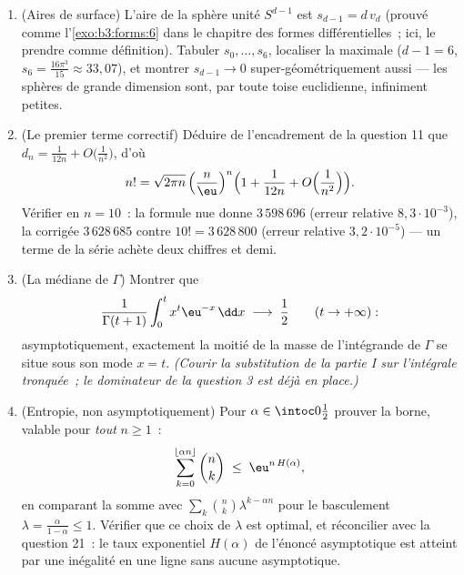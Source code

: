 \begin{problem}
\begin{enumerate}[resume]
        $H(\alpha) < \ln2$ pour $\alpha \neq \frac12$
        (donc les binomiaux hors  sont
        exponentiellement négligeables dans $2^n$).
  \item (Aires de surface) L'aire de la sphère unité
        $S^{d-1}$ est $s_{d-1} = d\,v_d$ (prouvé comme
        l'\cref{exo:b3:forms:6} dans le chapitre des formes
        différentielles~; ici, le prendre comme définition).
        Tabuler $s_0, \dots, s_6$, localiser la maximale ($d
        - 1 = 6$, $s_6 = \frac{16\pi^3}{15} \approx
        33{,}07$), et montrer $s_{d-1} \to 0$
        super-géométriquement aussi --- les sphères de
        grande dimension sont, par toute toise euclidienne,
        infiniment petites.
  \item (Le premier terme correctif) Déduire de
        l'encadrement de la question 11 que $d_n =
        \frac1{12n} + O\bigl(\frac1{n^2}\bigr)$, d'où
        \[
        n! = \sqrt{2\pi n}\,\Bigl(\frac
        n\eu\Bigr)^{n}\Bigl(1 + \frac1{12n} +
        O\Bigl(\frac1{n^2}\Bigr)\Bigr).
        \]
        Vérifier en $n = 10$~: la formule nue donne
        $3\,598\,696$ (erreur relative $8{,}3\cdot10^{-3}$),
        la corrigée $3\,628\,685$ contre $10! =
        3\,628\,800$ (erreur relative $3{,}2\cdot10^{-5}$)
        --- un terme de la série achète deux chiffres et
        demi.
  \item (La médiane de $\Gamma$) Montrer que
        \[
        \frac{1}{\Gamma(t+1)}
        \int_0^{t} x^{t}\eu^{-x}\,\dd x
        \;\longrightarrow\; \frac12
        \qquad (t \to +\infty) :
        \]
        asymptotiquement, exactement la moitié de la masse
        de l'intégrande de $\Gamma$ se situe sous son mode
        $x = t$. \emph{(Courir la substitution de la partie
        I sur l'intégrale tronquée~; le dominateur de la
        question 3 est déjà en place.)}
  \item (Entropie, non asymptotiquement) Pour $\alpha \in
        \intoc0{\frac12}$ prouver la borne, valable pour
        \emph{tout} $n \geq 1$~:
        \[
        \sum_{k=0}^{\lfloor\alpha n\rfloor}\binom nk
        \;\leq\; \eu^{n\,H(\alpha)} ,
        \]
        en comparant la somme avec $\sum_k\binom
        nk\lambda^{k-\alpha n}$ pour le basculement $\lambda
        = \frac{\alpha}{1-\alpha} \leq 1$. Vérifier que ce
        choix de $\lambda$ est optimal, et réconcilier avec
        la question 21~: le taux exponentiel $H(\alpha)$ de
        l'énoncé asymptotique est atteint par une inégalité
        en une ligne sans aucune asymptotique.
\end{enumerate}
\end{problem}
